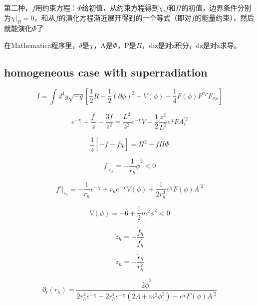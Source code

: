\documentclass[12pt,a4paper]{ctexart}
\numberwithin{equation}{section}
\begin{document}
第二种，$f$用约束方程：$\Phi$给初值，从约束方程得到$\chi$,$f$和$\Pi$的初值，边界条件分别为$\chi|_B=0$，和从$f$的演化方程渐近展开得到的一个等式（即对$f$的能量约束），然后就能演化$\Phi$了

在Mathematica程序里，$\delta$是$\chi$，A是$\Phi$，P是$\Pi$，diz是对z积分，dz是对z求导。

\subsection{homogeneous case with superradiation}

\begin{equation}
    I=\int d^{4}y\sqrt{-g}[\frac{1}{2}R-\frac{1}{2}(\partial\phi)^{2}-V(\phi)-\frac{1}{4}F(\phi)F^{\sigma\rho}F_{\sigma\rho}]
\end{equation}

\begin{equation}
    e^{-\chi}+\frac{f^{\prime}}{z}-\frac{3f}{z^{2}}=\frac{L^{2}}{z^{2}}e^{-\chi}V+\frac{1}{2}\frac{z^{2}}{L^{2}}e^{\chi}FA_{v}^{\prime2}
\end{equation}

\begin{equation}
    \frac{1}{z}[-\dot{f}-f\dot{\chi}]=\Pi^{2}-f\Pi\Phi
\end{equation}

\begin{equation}
    \dot{f}|_{r_h}=-\frac{1}{r_h}\dot{\phi}^2<0
\end{equation}

\begin{equation}
    f'|_{r_h}=-\frac{1}{r_h}e^{-\chi}+r_h e^{-\chi}V(\phi)+\frac{1}{2r_h^3}e^{\chi}F(\phi)A^{\prime2}
\end{equation}

\begin{equation}
    V(\phi)=-6+\frac{1}{2}m^2\phi^2<0
\end{equation}

\begin{equation}
    \dot{z}_{h}=-\frac{\dot{f}_{h}}{f_{h}^{\prime}}
\end{equation}

\begin{equation}
    \dot{z}_{h}=-\frac{\dot{r}_h}{r_h^2}
\end{equation}

\begin{equation}
    \partial_t(r_h)=\frac{2\dot{\phi}^2}{2r_h^2e^{-\chi}-2r_h^4 e^{-\chi}(2\Lambda+m^2\phi^2)-e^{\chi}F(\phi)A^{\prime2}}
\end{equation}
\end{document}
